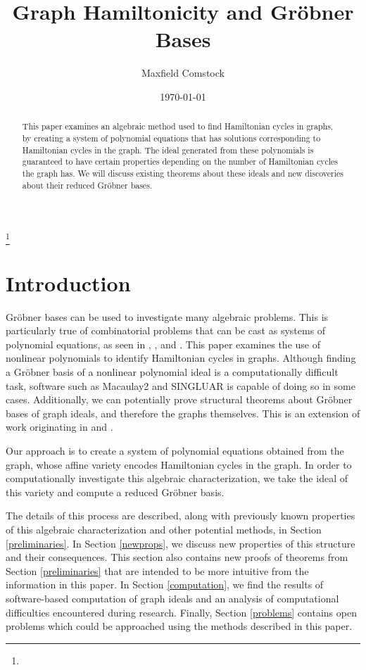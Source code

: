 \documentclass{amsart}
\renewcommand{\(}{\left(}
\renewcommand{\)}{\right)}
\newcommand{\<}{\langle}
\renewcommand{\>}{\rangle}
\theoremstyle{definition}
\theoremstyle{remark}
\begin{document}
\title{Graph Hamiltonicity and Gr\"{o}bner Bases}

\author{Maxfield Comstock}
\address{Department of Mathematics.  Harvey Mudd College, Claremont, CA 91711}





\begin{abstract}
This paper examines an algebraic method used to find Hamiltonian cycles in graphs, by creating a system of polynomial equations that has solutions corresponding to Hamiltonian cycles in the graph. The ideal generated from these polynomials is guaranteed to have certain properties depending on the number of Hamiltonian cycles the graph has. We will discuss existing theorems about these ideals and new discoveries about their reduced Gr\"obner bases.
\end{abstract}

\thanks{}
\date{\today}
\maketitle

\section{Introduction}
Gr\"obner bases can be used to investigate many algebraic problems. This is particularly true of combinatorial problems that can be cast as systems of polynomial equations, as seen in \cite{deloera07}, \cite{deloera10}, and \cite{hillar06}. This paper examines the use of nonlinear polynomials to identify Hamiltonian cycles in graphs. Although finding a Gr\"obner basis of a nonlinear polynomial ideal is a computationally difficult task, software such as Macaulay2 and SINGLUAR is capable of doing so in some cases. Additionally, we can potentially prove structural theorems about Gr\"obner bases of graph ideals, and therefore the graphs themselves. This is an extension of work originating in \cite{deloera10} and \cite{hillar06}.

Our approach is to create a system of polynomial equations obtained from the graph, whose affine variety encodes Hamiltonian cycles in the graph. In order to computationally investigate this algebraic characterization, we take the ideal of this variety and compute a reduced Gr\"obner basis.

The details of this process are described, along with previously known properties of this algebraic characterization and other potential methods, in Section \ref{preliminaries}. In Section \ref{newprops}, we discuss new properties of this structure and their consequences. This section also contains new proofs of theorems from Section \ref{preliminaries} that are intended to be more intuitive from the information in this paper. In Section \ref{computation}, we find the results of software-based computation of graph ideals and an analysis of computational difficulties encountered during research. Finally, Section \ref{problems} contains open problems which could be approached using the methods described in this paper.
\end{document}
